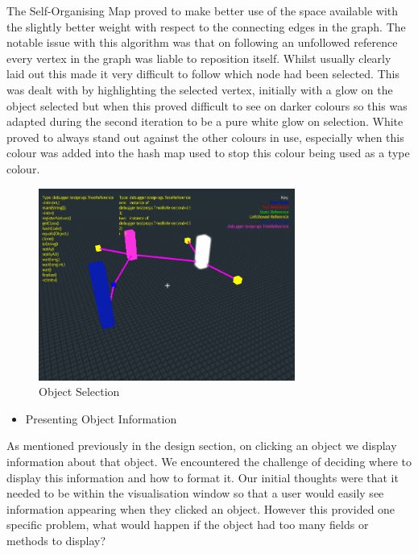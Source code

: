 \documentclass[11pt, a4paper]{report}
\begin{document}
The Self-Organising Map proved to make better use of the space available with the slightly better weight with respect to the connecting edges in the graph. The notable issue with this algorithm was that on following an unfollowed reference every vertex in the graph was liable to reposition itself. Whilst usually clearly laid out this made it very difficult to follow which node had been selected. This was dealt with by highlighting the selected vertex, initially with a glow on the object selected but when this proved difficult to see on darker colours so this was adapted during the second iteration to be a pure white glow on selection. White proved to always stand out against the other colours in use, especially when this colour was added into the hash map used to stop this colour being used as a type colour.

\begin{figure}[h]
        \centering
        \includegraphics[width=0.75\textwidth]{images/final/objectselect.png}
        \caption{Object Selection}
\end{figure}

\begin{itemize}
  \item Presenting Object Information
\end{itemize}

As mentioned previously in the design section, on clicking an object we display information about that object. We encountered the challenge of deciding where to display this information and how to format it. Our initial thoughts were that it needed to be within the visualisation window so that a user would easily see information appearing when they clicked an object. However this provided one specific problem, what would happen if the object had too many fields or methods to display? 
\end{document}
